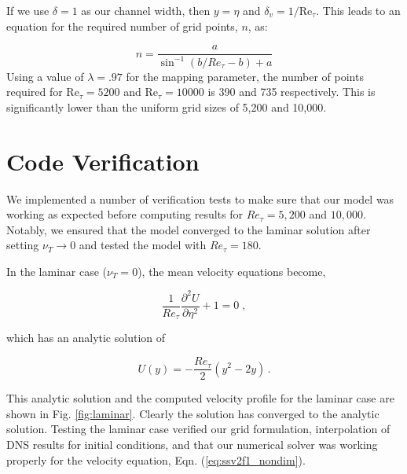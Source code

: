 \documentclass[a4paper,11pt]{article}
\newcommand{\noi}{\noindent}
\begin{document}
If we use $\delta = 1$ as our channel width, then $y = \eta$ and $\delta_v = 1/\mathrm{Re}_{\tau}$.  This leads to an equation for the required number of grid points, $n$, as:

\begin{equation}
 n = \frac{a}{\sin^{-1}(b/Re_{\tau}-b)+a}
\end{equation}
Using a value of $\lambda = .97$ for the mapping parameter, the number of points required for $\mathrm{Re}_{\tau}=5200$ and $\mathrm{Re}_{\tau}=10000$ is 390 and 735 respectively. This is significantly lower than the uniform grid sizes of 5,200 and 10,000.


\section{Code Verification}

We implemented a number of verification tests to make sure that our model was
working as expected before computing results for $Re_\tau = 5,200$ and
$10,000$. Notably, we ensured that the model converged to the laminar solution
after setting $\nu_T \rightarrow 0$ and tested the model with $Re_\tau = 180$. 


In the laminar case ($\nu_T = 0$), the mean velocity equations become, 

\begin{equation*}
	\frac{1}{Re_\tau} \frac{\partial^2 U}{\partial \eta^2} +1 = 0 \;,
\end{equation*}

\noi which has an analytic solution of 

\begin{equation*}
  U(y) = -\frac{Re_\tau}{2}\left(y^2 - 2y\right) \, .
\end{equation*}

\noi This analytic solution and the computed velocity profile for the laminar
case are shown in Fig.
\ref{fig:laminar}. Clearly the solution has converged to the analytic
solution. Testing the laminar case verified our grid formulation, interpolation of DNS
results for initial conditions, and that our numerical solver was working
properly for the velocity equation, Eqn.
(\ref{eq:ssv2f1_nondim}). 
\end{document}
